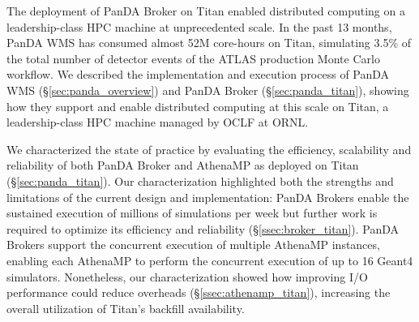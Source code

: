 
The deployment of PanDA Broker on Titan enabled distributed computing on a
leadership-class HPC machine at unprecedented scale. In the past 13 months,
PanDA WMS has consumed almost 52M core-hours on Titan, simulating 3.5\% of the
total number of detector events of the ATLAS production Monte Carlo workflow. We
described the implementation and execution process of PanDA WMS
(\S\ref{sec:panda_overview}) and PanDA Broker (\S\ref{sec:panda_titan}), showing
how they support and enable distributed computing at this scale on Titan, a
leadership-class HPC machine managed by OCLF at ORNL.

We characterized the state of practice by evaluating the efficiency, scalability
and reliability of both PanDA Broker and AthenaMP as deployed on Titan
(\S\ref{sec:panda_titan}). Our characterization highlighted both the strengths
and limitations of the current design and implementation: PanDA Brokers enable
the sustained execution of millions of simulations per week but further work is
required to optimize its efficiency and reliability (\S\ref{ssec:broker_titan}).
PanDA Brokers support the concurrent execution of multiple AthenaMP instances,
enabling each AthenaMP to perform the concurrent execution of up to 16 Geant4
simulators. Nonetheless, our characterization showed how improving I/O
performance could reduce overheads (\S\ref{ssec:athenamp_titan}), increasing the
overall utilization of Titan's backfill availability.

